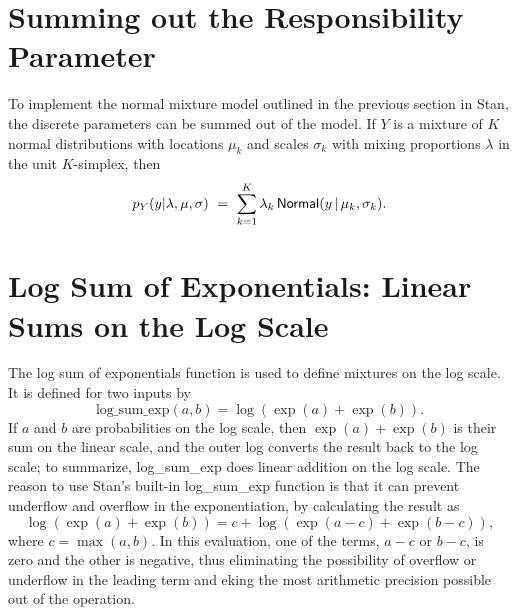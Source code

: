 \section{Summing out the Responsibility Parameter}

To implement the normal mixture model outlined in the previous
section in Stan, the discrete parameters can be summed out of the
model. If $Y$ is a mixture of $K$ normal distributions with 
locations $\mu_k$ and scales $\sigma_k$ with mixing proportions
$\lambda$ in the unit $K$-simplex, then 
\[
p_Y(y | \lambda, \mu, \sigma)
\ = \ 
\sum_{k=1}^K \lambda_k \, \distro{Normal}(y \, | \, \mu_k, \sigma_k).
\]

\section{Log Sum of Exponentials: Linear Sums on the Log Scale}

The log sum of exponentials function is used to define mixtures on the
log scale.  It is defined for two inputs by
%
\[
\mbox{log\_sum\_exp}(a, b) = \log (\exp(a) + \exp(b)).
\]
%
If $a$ and $b$ are probabilities on the log scale, then $\exp(a) +
\exp(b)$ is their sum on the linear scale, and the outer log converts
the result back to the log scale; to summarize, log\_sum\_exp does
linear addition on the log scale.   The reason to use Stan's built-in
log\_sum\_exp function is that it can prevent underflow and overflow
in the exponentiation, by calculating the result as
%
\[
\log\left( \exp(a) + \exp(b)\right)
= c
  + \log \left( \exp(a - c) + \exp(b - c) \right),
\]
%
where $c = \max(a, b)$.
In this evaluation, one of the terms, $a - c$ or $b -
c$, is zero and the other is negative, thus eliminating the
possibility of overflow or underflow in the leading term and eking the
most arithmetic precision possible out of the operation.

